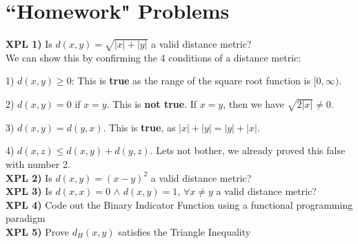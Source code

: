 \section{``Homework" Problems}

\quad \textbf{XPL 1)} Is $d(x,y) = \sqrt{|x| + |y|}$ a valid distance metric? \\

We can show this by confirming the 4 conditions of a distance metric:

1) $d(x,y) \ge 0$: This is \textbf{true} as the range of the square root function is $[0,\infty)$.

2) $d(x,y) = 0$ if $x=y$. This is \textbf{not true}. If $x=y$, then we have $\sqrt{2|x|} \neq 0$.

3) $d(x,y) = d(y,x)$. This is \textbf{true}, as $|x| + |y| = |y| + |x|$.

4) $d(x,z) \leq d(x,y) + d(y,z)$. Lets not bother, we already proved this false with number 2. \\


\quad \textbf{XPL 2)}  Is $d(x,y) = (x -y)^2$ a valid distance metric? \\

\quad \textbf{XPL 3)} Is $d(x,x) = 0$ $\wedge$ $d(x,y) = 1$, $\forall x \neq y$ a valid distance metric? \\

\quad \textbf{XPL 4)} Code out the Binary Indicator Function using a functional programming paradigm \\

\quad \textbf{XPL 5)} Prove $d_H(x,y)$ satisfies the Triangle Inequality
